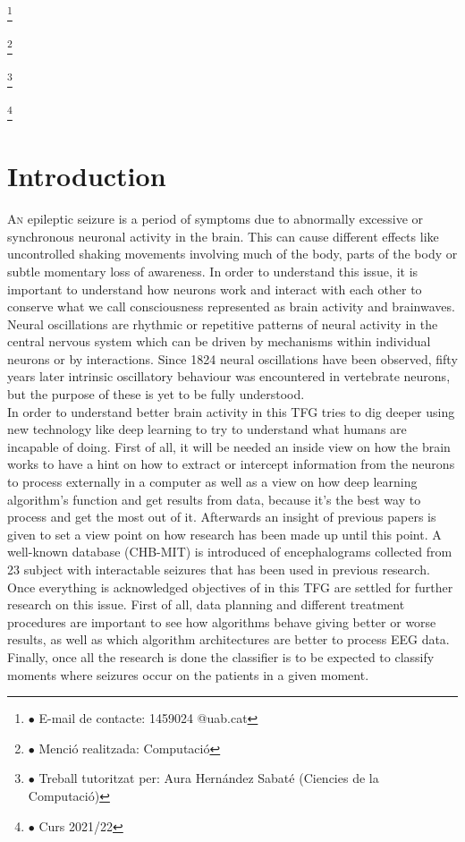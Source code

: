 ﻿\documentclass[10pt,a4paper,twocolumn,twoside]{article}
\newcommand\blfootnote[1]{%
  \begingroup
  \renewcommand\thefootnote{}\footnote{#1}%
  \addtocounter{footnote}{-1}%
  \endgroup
}
\begin{document}
\blfootnote{$\bullet$ E-mail de contacte: 1459024 @uab.cat}
\blfootnote{$\bullet$ Menció realitzada: Computació }
\blfootnote{$\bullet$ Treball tutoritzat per: Aura Hernández Sabaté (Ciencies de la Computació)}
\blfootnote{$\bullet$ Curs 2021/22}

\section{Introduction}

\lettrine[lines=3]{A}{n} epileptic seizure is a period of symptoms due to abnormally excessive or synchronous neuronal activity in the brain. This can cause different effects like uncontrolled shaking movements involving much of the body, parts of the body or subtle momentary loss of awareness. In order to understand this issue, it is important to understand how neurons work and interact with each other to conserve what we call consciousness represented as brain activity and brainwaves. 
\\
Neural oscillations are rhythmic or repetitive patterns of neural activity in the central nervous system which can be driven by mechanisms within individual neurons or by interactions. Since 1824 neural oscillations have been observed, fifty years later intrinsic oscillatory behaviour was encountered in vertebrate neurons, but the purpose of these is yet to be fully understood.
\\
In order to understand better brain activity in this TFG tries to dig deeper using new technology like deep learning to try to understand what humans are incapable of doing. First of all, it will be needed an inside view on how the brain works to have a hint on how to extract or intercept information from the neurons to process externally in a computer as well as a view on how deep learning algorithm’s function and get results from data, because it’s the best way to process and get the most out of it. Afterwards an insight of previous papers is given to set a view point on how research has been made up until this point. A well-known database (CHB-MIT) is introduced of encephalograms collected from 23 subject with interactable seizures that has been used in previous research.
\\
Once everything is acknowledged objectives of in this TFG are settled for further research on this issue. First of all, data planning and different treatment procedures are important to see how algorithms behave giving better or worse results, as well as which algorithm architectures are better to process EEG data. Finally, once all the research is done the classifier is to be expected to classify moments where seizures occur on the patients in a given moment.
\\
\end{document}
